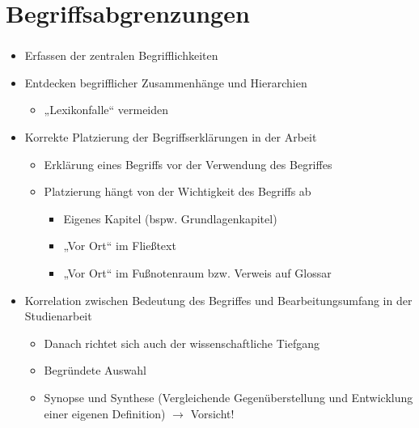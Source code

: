 \documentclass[aspectratio=169]{beamer}
\begin{document}
\section{Begriffsabgrenzungen}
\begin{frame}
  \frametitle{\insertsection}%
  \framesubtitle{\insertsubsection}%
  \begin{itemize}
   \item Erfassen der zentralen Begrifflichkeiten
   \item Entdecken begrifflicher Zusammenhänge und Hierarchien
   \begin{itemize}
    \item „Lexikonfalle“ vermeiden
   \end{itemize}
   \item Korrekte Platzierung der Begriffserklärungen in der Arbeit
   \begin{itemize}
    \item Erklärung eines Begriffs vor der Verwendung des Begriffes
    \item Platzierung hängt von der Wichtigkeit des Begriffs ab
    \begin{itemize}
     \item Eigenes Kapitel (bspw. Grundlagenkapitel)
     \item „Vor Ort“ im Fließtext
     \item „Vor Ort“ im Fußnotenraum bzw. Verweis auf Glossar
    \end{itemize}
   \end{itemize}
   \item Korrelation zwischen Bedeutung des Begriffes und Bearbeitungsumfang in der Studienarbeit
   \begin{itemize}
    \item Danach richtet sich auch der wissenschaftliche Tiefgang
    \item Begründete Auswahl
    \item Synopse und Synthese (Vergleichende Gegenüberstellung und Entwicklung einer eigenen Definition) $\rightarrow$ Vorsicht!
   \end{itemize}
  \end{itemize}
\end{frame}
\end{document}
